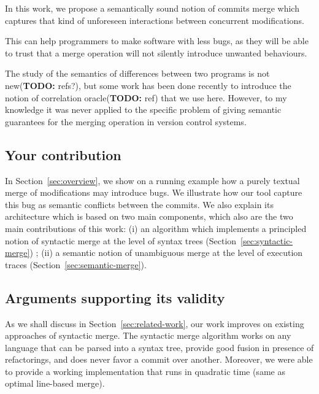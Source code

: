 \documentclass[a4paper,11pt]{article}
\newcommand\todo[1]{{\color{teal}(\textbf{TODO:} #1)}}
\begin{document}
In this work, we propose a semantically sound notion of commits 
merge which captures that kind of unforeseen interactions 
between concurrent modifications.

This can help programmers to make software with less bugs, as they will be able to trust that a merge operation will not silently introduce unwanted behaviours.

The study of the semantics of differences between two programs is not new\todo{refs?}, but some work has been done recently to introduce the notion of correlation oracle\todo{ref} that we use here. However, to my knowledge it was never applied to the specific problem of giving semantic guarantees for the merging operation in version control systems.

\subsection*{Your contribution}


In Section~\ref{sec:overview}, we show on a running example how a
purely textual merge of modifications may introduce bugs. We
illustrate how our tool capture this bug as semantic conflicts between
the commits. We also explain its architecture which is based on two
main components, which also are the two main contributions of this
work: (i) an algorithm which implements a principled notion of
syntactic merge at the level of syntax trees (Section~\ref{sec:syntactic-merge}) ; (ii) a semantic notion of unambiguous merge
at the level of execution traces (Section~\ref{sec:semantic-merge}).

\subsection*{Arguments supporting its validity}


As we shall discuss in Section~\ref{sec:related-work}, our work
improves on existing approaches of syntactic merge. The syntactic merge algorithm works on any language that can be parsed into a syntax tree, provide good fusion in presence of refactorings, and does never favor a commit over another. Moreover, we were able to provide a working implementation that runs in quadratic time (same as optimal line-based merge).
\end{document}
